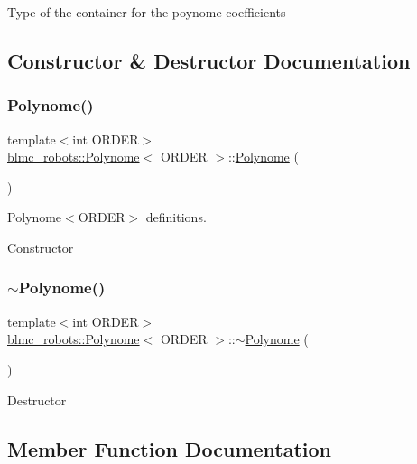 Type of the container for the poynome coefficients 

\subsection{Constructor \& Destructor Documentation}
\mbox{\label{classblmc__robots_1_1Polynome_a8ece7a7021cc62167c023d51a5bb3879}} 
\subsubsection{\texorpdfstring{Polynome()}{Polynome()}}
{\footnotesize\ttfamily template$<$int O\+R\+D\+ER$>$ \\
\hyperlink{classblmc__robots_1_1Polynome}{blmc\+\_\+robots\+::\+Polynome}$<$ O\+R\+D\+ER $>$\+::\hyperlink{classblmc__robots_1_1Polynome}{Polynome} (\begin{DoxyParamCaption}{ }\end{DoxyParamCaption})}



Polynome$<$\+O\+R\+D\+E\+R$>$ definitions. 

Constructor \mbox{\label{classblmc__robots_1_1Polynome_a4541e4b629061dfdbca73559a42a6e93}} 
\subsubsection{\texorpdfstring{$\sim$\+Polynome()}{~Polynome()}}
{\footnotesize\ttfamily template$<$int O\+R\+D\+ER$>$ \\
\hyperlink{classblmc__robots_1_1Polynome}{blmc\+\_\+robots\+::\+Polynome}$<$ O\+R\+D\+ER $>$\+::$\sim$\hyperlink{classblmc__robots_1_1Polynome}{Polynome} (\begin{DoxyParamCaption}{ }\end{DoxyParamCaption})}

Destructor 

\subsection{Member Function Documentation}
\mbox{\label{classblmc__robots_1_1Polynome_ae102191e0f730744e822c8e7599008d6}} 
